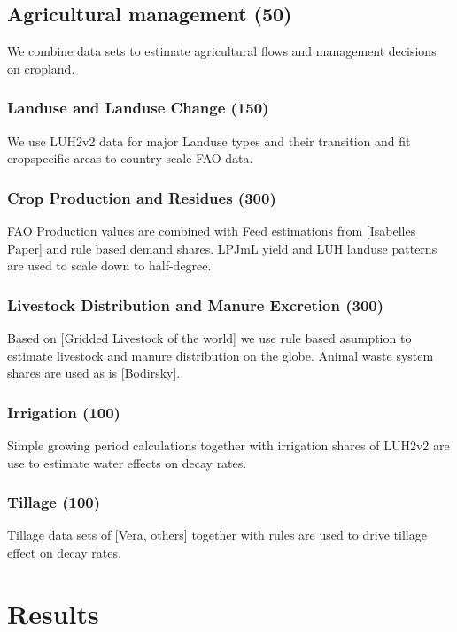 \documentclass[gc, manuscript]{copernicus}
\begin{document}
\subsection{Agricultural management (50)}\label{sec:agrimanagement}

We combine data sets to estimate agricultural flows and management
decisions on cropland.

\subsubsection{Landuse and Landuse Change (150)}

We use LUH2v2 data for major Landuse types and their transition and fit
cropspecific areas to country scale FAO data.

\subsubsection{Crop Production and Residues (300)}

FAO Production values are combined with Feed estimations from
{[}Isabelles Paper{]} and rule based demand shares. LPJmL yield and LUH
landuse patterns are used to scale down to half-degree.

\subsubsection{Livestock Distribution and Manure Excretion (300)}

Based on {[}Gridded Livestock of the world{]} we use rule based
asumption to estimate livestock and manure distribution on the globe.
Animal waste system shares are used as is {[}Bodirsky{]}.

\subsubsection{Irrigation (100)}

Simple growing period calculations together with irrigation shares of
LUH2v2 are use to estimate water effects on decay rates.

\subsubsection{Tillage (100)}

Tillage data sets of {[}Vera, others{]} together with rules are used to
drive tillage effect on decay rates.

\section{Results}
\end{document}
